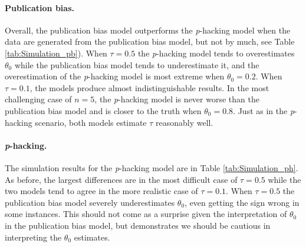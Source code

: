 \documentclass{article}
\theoremstyle{plain}
\theoremstyle{definition}
\begin{document}


\paragraph{Publication bias.} 
Overall, the publication bias model outperforms the \textit{p}-hacking model when the data are generated from the publication bias model, but not by much, see Table \ref{tab:Simulation_pb}). When $\tau = 0.5$ the \textit{p}-hacking model tends to overestimates $\theta_0$ while the publication bias model tends to underestimate it, and the overestimation of the \textit{p}-hacking model is most extreme when $\theta_0 = 0.2$. When $\tau = 0.1$, the models produce almost indistinguishable results. In the most challenging case of $n=5$, the \textit{p}-hacking model is never worse than the publication bias model and is closer to the truth when $\theta_0 = 0.8$. Just as in the \textit{p}-hacking scenario, both models estimate $\tau$ reasonably well.



\paragraph{\textit{p}-hacking.} The simulation results for the \textit{p}-hacking model are in Table \ref{tab:Simulation_ph}. As before, the largest differences are in the most difficult case of $\tau = 0.5$ while the two models tend to agree in the more realistic case of $\tau = 0.1$. When $\tau = 0.5$ the publication bias model severely underestimates $\theta_0$, even getting the sign wrong in some instances. This should not come as a surprise given the interpretation of $\theta_0$ in the publication bias model, but demonstrates we should be cautious in interpreting the $\theta_0$ estimates. 


\end{document}
